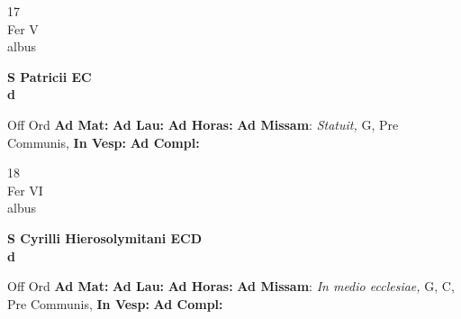 \documentclass[10pt, openany]{book}
\begin{document}
        \begin{center}
            \begin{minipage}{3.5in}
                \vspace{2em}
                \begin{minipage}{0.5in}
                    {\Huge 17} \\
                    {\normalsize Fer V} \\
                    {\normalsize albus}
                \end{minipage}
                \begin{minipage}{3.0in}
                    \textbf{ \large S Patricii EC \\
                    \textnormal{\normalsize d}} \\ 
                \end{minipage}
                \begin{justify}Off Ord
                    \textbf{Ad Mat: }
                    \textbf{Ad Lau: }
                    \textbf{Ad Horas: }\textbf{Ad Missam}: \textit{Statuit,} G, Pre Communis,  
                    \textbf{In Vesp: }
                    \textbf{Ad Compl: }
                \end{justify}
            \end{minipage}
        \end{center}
    
        \begin{center}
            \begin{minipage}{3.5in}
                \vspace{2em}
                \begin{minipage}{0.5in}
                    {\Huge 18} \\
                    {\normalsize Fer VI} \\
                    {\normalsize albus}
                \end{minipage}
                \begin{minipage}{3.0in}
                    \textbf{ \large S Cyrilli Hierosolymitani ECD \\
                    \textnormal{\normalsize d}} \\ 
                \end{minipage}
                \begin{justify}Off Ord
                    \textbf{Ad Mat: }
                    \textbf{Ad Lau: }
                    \textbf{Ad Horas: }\textbf{Ad Missam}: \textit{In medio ecclesiae,} G, C, Pre Communis,  
                    \textbf{In Vesp: }
                    \textbf{Ad Compl: }
                \end{justify}
            \end{minipage}
        \end{center}
    
\end{document}
